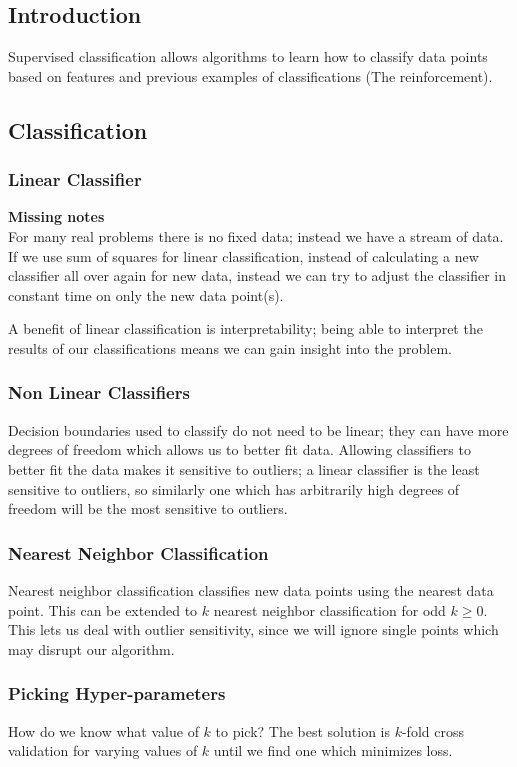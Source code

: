 \documentclass{chezarticle}
\begin{document}
\subsection{Introduction}
Supervised classification allows algorithms to learn how to classify data points based on features and previous examples of classifications (The reinforcement).
\subsection{Classification}
\subsubsection{Linear Classifier}
\textbf{Missing notes}\\
For many real problems there is no fixed data; instead we have a stream of data. If we use sum of squares for linear classification, instead of calculating a new classifier all over again for new data, instead we can try to adjust the classifier in constant time on only the new data point(s). 
\begin{note}
A benefit of linear classification is interpretability; being able to interpret the results of our classifications means we can gain insight into the problem.
\end{note}

\subsubsection{Non Linear Classifiers}
Decision boundaries used to classify do not need to be linear; they can have more degrees of freedom which allows us to better fit data. Allowing classifiers to better fit the data makes it sensitive to outliers; a linear classifier is the least sensitive to outliers, so similarly one which has arbitrarily high degrees of freedom will be the most sensitive to outliers. 
\subsubsection{Nearest Neighbor Classification}
Nearest neighbor classification classifies new data points using the nearest data point. This can be extended to $k$ nearest neighbor classification for odd $k \geq 0$. This lets us deal with outlier sensitivity, since we will ignore single points which may disrupt our algorithm.
\subsubsection{Picking Hyper-parameters}
How do we know what value of $k$ to pick? The best solution is $k$-fold cross validation for varying values of $k$ until we find one which minimizes loss. 
\end{document}
